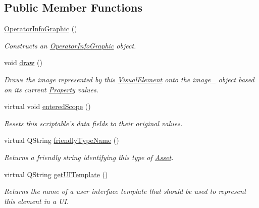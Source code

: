 \subsection*{Public Member Functions}
\begin{DoxyCompactItemize}
\item 
\hyperlink{class_picto_1_1_operator_info_graphic_a2f0f650831ef7f5be1c7f29a33ec25dd}{Operator\-Info\-Graphic} ()
\begin{DoxyCompactList}\small\item\em Constructs an \hyperlink{class_picto_1_1_operator_info_graphic}{Operator\-Info\-Graphic} object. \end{DoxyCompactList}\item 
\hypertarget{class_picto_1_1_operator_info_graphic_ae5c3ffc7afac923256e12d5885d51dd8}{void \hyperlink{class_picto_1_1_operator_info_graphic_ae5c3ffc7afac923256e12d5885d51dd8}{draw} ()}\label{class_picto_1_1_operator_info_graphic_ae5c3ffc7afac923256e12d5885d51dd8}

\begin{DoxyCompactList}\small\item\em Draws the image represented by this \hyperlink{struct_picto_1_1_visual_element}{Visual\-Element} onto the image\-\_\- object based on its current \hyperlink{class_picto_1_1_property}{Property} values. \end{DoxyCompactList}\item 
virtual void \hyperlink{class_picto_1_1_operator_info_graphic_ae3c0c8945895590fe3a77de856140bd5}{entered\-Scope} ()
\begin{DoxyCompactList}\small\item\em Resets this scriptable's data fields to their original values. \end{DoxyCompactList}\item 
virtual Q\-String \hyperlink{class_picto_1_1_operator_info_graphic_abb462c96c24feac2fa4d4c5223bc327c}{friendly\-Type\-Name} ()
\begin{DoxyCompactList}\small\item\em Returns a friendly string identifying this type of \hyperlink{class_picto_1_1_asset}{Asset}. \end{DoxyCompactList}\item 
\hypertarget{class_picto_1_1_operator_info_graphic_a53c222e79397fc9570ad6a660ada3499}{virtual Q\-String \hyperlink{class_picto_1_1_operator_info_graphic_a53c222e79397fc9570ad6a660ada3499}{get\-U\-I\-Template} ()}\label{class_picto_1_1_operator_info_graphic_a53c222e79397fc9570ad6a660ada3499}

\begin{DoxyCompactList}\small\item\em Returns the name of a user interface template that should be used to represent this element in a U\-I. \end{DoxyCompactList}\end{DoxyCompactItemize}
